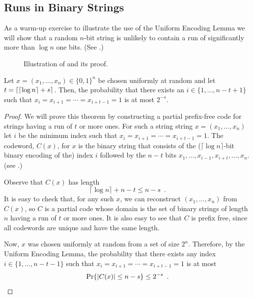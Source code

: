 \documentclass{patmorin}
\begin{document}
\subsection{Runs in Binary Strings}

As a warm-up exercise to illustrate the use of the Uniform Encoding
Lemma we will show that a random $n$-bit string is unlikely to contain
a run of significantly more than $\log n$ one bits.  (See
.)

\begin{figure}
  \caption{Illustration of  and its proof.}
\end{figure}

\begin{thm}
  Let $x=(x_1,\ldots,x_n)\in\{0,1\}^n$ be chosen uniformly at random
  and let $t = {\lceil {\lceil \log n \rceil} + s \rceil}$. Then, the probability that
  there exists an $i\in\{1,\ldots,n-t+1\}$ such that
  $x_i=x_{i+1}=\cdots=x_{i+t-1}=1$ is at most $2^{-s}$.
\end{thm}

\begin{proof}
  We will prove this theorem by constructing a partial prefix-free
  code for strings having a run of $t$ or more ones.  For such a
  string string $x=(x_1,\ldots,x_n)$ let $i$ be the minimum index such
  that $x_i=x_{i+1}=\cdots=x_{i+t-1}=1$. The codeword, $C(x)$, for $x$
  is the binary string that consists of the
  ($\lceil\log n\rceil$-bit binary encoding of the) index $i$
  followed by the $n-t$ bits
  $x_1,\ldots,x_{i-1},x_{i+t},\ldots,x_n$. (see .)

  Observe that $C(x)$ has length 
  \[
    \lceil\log n \rceil + n - t \le n-s \enspace .
  \]
  It is easy to check that, for any such $x$, we can reconstruct
  $(x_1,\ldots,x_n)$ from $C(x)$, so $C$ is a partial code whose
  domain is the set of binary strings of length $n$ having a run of
  $t$ or more ones.  It is also easy to see that $C$ is prefix free,
  since all codewords are unique and have the same length.

  Now, $x$ was chosen uniformly at random from a set of size $2^{n}$.
  Therefore, by the Uniform Encoding Lemma, the probability that there
  exists any index $i\in\{1,\ldots,n-t-1\}$ such that
  $x_i=x_{i+1}=\cdots=x_{i+t-1}=1$ is at most
  \[
    \Pr\{|C(x)|\le n-s\} \le 2^{-s} \enspace . \qedhere 
  \]
\end{proof}
\end{document}
